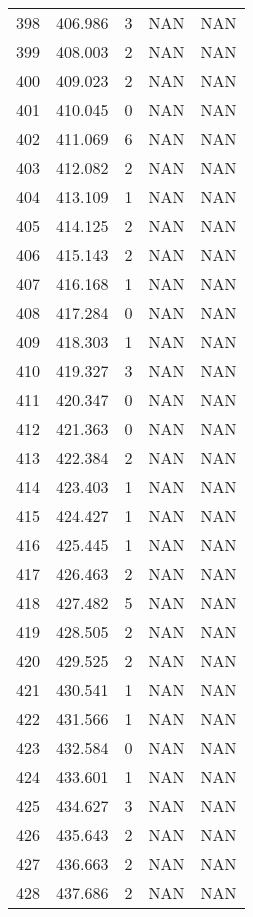 \documentclass{article}
\begin{document}
\begin{longtable}{@{}lllll@{}}
					398 & 406.986 & 3     & NAN   & NAN   \\
					399 & 408.003 & 2     & NAN   & NAN   \\
					400 & 409.023 & 2     & NAN   & NAN   \\
					401 & 410.045 & 0     & NAN   & NAN   \\
					402 & 411.069 & 6     & NAN   & NAN   \\
					403 & 412.082 & 2     & NAN   & NAN   \\
					404 & 413.109 & 1     & NAN   & NAN   \\
					405 & 414.125 & 2     & NAN   & NAN   \\
					406 & 415.143 & 2     & NAN   & NAN   \\
					407 & 416.168 & 1     & NAN   & NAN   \\
					408 & 417.284 & 0     & NAN   & NAN   \\
					409 & 418.303 & 1     & NAN   & NAN   \\
					410 & 419.327 & 3     & NAN   & NAN   \\
					411 & 420.347 & 0     & NAN   & NAN   \\
					412 & 421.363 & 0     & NAN   & NAN   \\
					413 & 422.384 & 2     & NAN   & NAN   \\
					414 & 423.403 & 1     & NAN   & NAN   \\
					415 & 424.427 & 1     & NAN   & NAN   \\
					416 & 425.445 & 1     & NAN   & NAN   \\
					417 & 426.463 & 2     & NAN   & NAN   \\
					418 & 427.482 & 5     & NAN   & NAN   \\
					419 & 428.505 & 2     & NAN   & NAN   \\
					420 & 429.525 & 2     & NAN   & NAN   \\
					421 & 430.541 & 1     & NAN   & NAN   \\
					422 & 431.566 & 1     & NAN   & NAN   \\
					423 & 432.584 & 0     & NAN   & NAN   \\
					424 & 433.601 & 1     & NAN   & NAN   \\
					425 & 434.627 & 3     & NAN   & NAN   \\
					426 & 435.643 & 2     & NAN   & NAN   \\
					427 & 436.663 & 2     & NAN   & NAN   \\
					428 & 437.686 & 2     & NAN   & NAN   \\

\end{longtable}
\end{document}
